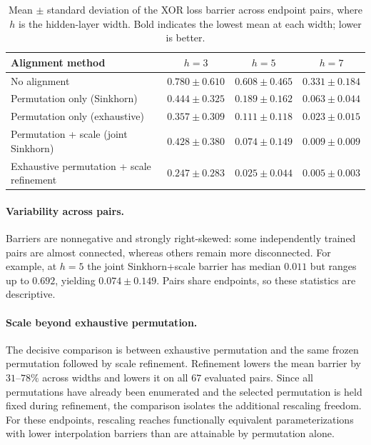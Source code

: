 \documentclass[twoside]{article}
\begin{document}
\begin{table}[!t]
\centering
\begin{tabular}{@{}lccc@{}}
\toprule
Alignment method & $h=3$ & $h=5$ & $h=7$ \\
\midrule
No alignment & $0.780\pm0.610$ & $0.608\pm0.465$ & $0.331\pm0.184$ \\
Permutation only (Sinkhorn) & $0.444\pm0.325$ & $0.189\pm0.162$ & $0.063\pm0.044$ \\
Permutation only (exhaustive) & $0.357\pm0.309$ & $0.111\pm0.118$ & $0.023\pm0.015$ \\
\addlinespace[2pt]
Permutation + scale (joint Sinkhorn) & $0.428\pm0.380$ & $0.074\pm0.149$ & $0.009\pm0.009$ \\
Exhaustive permutation + scale refinement & $\mathbf{0.247\pm0.283}$ & $\mathbf{0.025\pm0.044}$ & $\mathbf{0.005\pm0.003}$ \\
\bottomrule
\end{tabular}
\caption{Mean $\pm$ standard deviation of the XOR loss barrier across endpoint
pairs, where $h$ is the hidden-layer width.  Bold indicates the lowest mean at
each width; lower is better.}
\label{tab:xor-scale}
\end{table}

\paragraph{Variability across pairs.}
Barriers are nonnegative and strongly right-skewed: some independently trained
pairs are almost connected, whereas others remain more disconnected.  For
example, at $h=5$ the joint
Sinkhorn+scale barrier has median $0.011$ but ranges up to $0.692$, yielding
$0.074\pm0.149$.  Pairs share endpoints, so these statistics are descriptive.

\paragraph{Scale beyond exhaustive permutation.}
The decisive comparison is between exhaustive permutation and the same frozen
permutation followed by scale refinement.  Refinement lowers the mean barrier
by $31$--$78\%$ across widths and lowers it on all $67$ evaluated pairs.  Since
all permutations have already been enumerated and the selected permutation is
held fixed during refinement, the comparison isolates the additional rescaling
freedom.  For these endpoints, rescaling reaches functionally equivalent
parameterizations with lower interpolation barriers than are attainable by
permutation alone.
\end{document}
